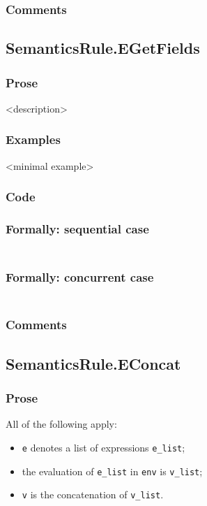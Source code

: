 \documentclass{book}
\begin{document}
  \subsubsection{Comments}

\subsection{SemanticsRule.EGetFields \label{sec:SemanticsRule.EGetFields}}

  \subsubsection{Prose}
  <description>

  \subsubsection{Examples}
  <minimal example>

  \subsubsection{Code}

  \subsubsection{Formally: sequential case}
  \begin{align}
  \end{align} 

  \subsubsection{Formally: concurrent case}
  \begin{align}
  \end{align} 

  \subsubsection{Comments}

\subsection{SemanticsRule.EConcat \label{sec:SemanticsRule.EConcat}}

  \subsubsection{Prose}
  All of the following apply:
  \begin{itemize}
  \item \texttt{e} denotes a list of expressions \texttt{e\_list};
  \item the evaluation of \texttt{e\_list} in \texttt{env} is \texttt{v\_list};
  \item \texttt{v} is the concatenation of \texttt{v\_list}.
  \end{itemize}
\end{document}
